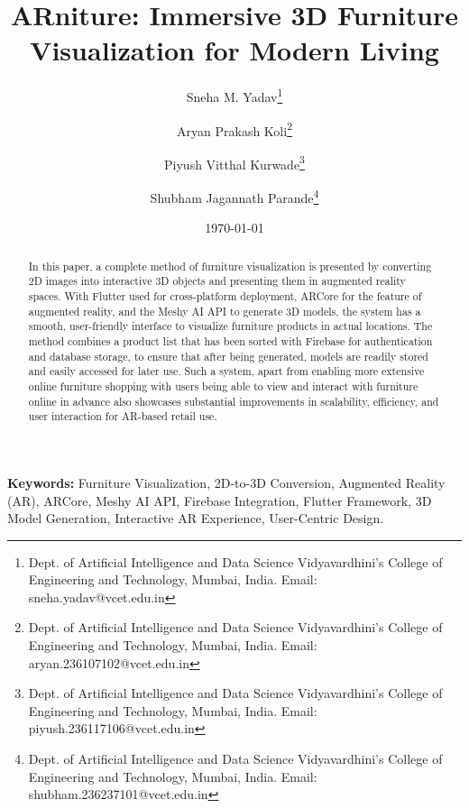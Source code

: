 \documentclass[12pt, a4paper]{article}
\title{ARniture: Immersive 3D Furniture Visualization for Modern Living}
\author{Sneha M. Yadav\thanks{Dept. of Artificial Intelligence and Data Science Vidyavardhini's College of Engineering and Technology, Mumbai, India. Email: sneha.yadav@vcet.edu.in} \and Aryan Prakash Koli\thanks{Dept. of Artificial Intelligence and Data Science Vidyavardhini's College of Engineering and Technology, Mumbai, India. Email: aryan.236107102@vcet.edu.in} \and Piyush Vitthal Kurwade\thanks{Dept. of Artificial Intelligence and Data Science Vidyavardhini's College of Engineering and Technology, Mumbai, India. Email: piyush.236117106@vcet.edu.in} \and Shubham Jagannath Parande\thanks{Dept. of Artificial Intelligence and Data Science Vidyavardhini's College of Engineering and Technology, Mumbai, India. Email: shubham.236237101@vcet.edu.in}}
\date{\today}
\begin{document}
\maketitle

\begin{abstract}
In this paper, a complete method of furniture visualization is presented by converting 2D images into interactive 3D objects and presenting them in augmented reality spaces. With Flutter used for cross-platform deployment, ARCore for the feature of augmented reality, and the Meshy AI API to generate 3D models, the system has a smooth, user-friendly interface to visualize furniture products in actual locations. The method combines a product list that has been sorted with Firebase for authentication and database storage, to ensure that after being generated, models are readily stored and easily accessed for later use. Such a system, apart from enabling more extensive online furniture shopping with users being able to view and interact with furniture online in advance also showcases substantial improvements in scalability, efficiency, and user interaction for AR-based retail use.
\end{abstract}
\noindent\textbf{Keywords:} Furniture Visualization, 2D-to-3D Conversion, Augmented Reality (AR), ARCore, Meshy AI API, Firebase Integration, Flutter Framework, 3D Model Generation, Interactive AR Experience, User-Centric Design.
\end{document}
